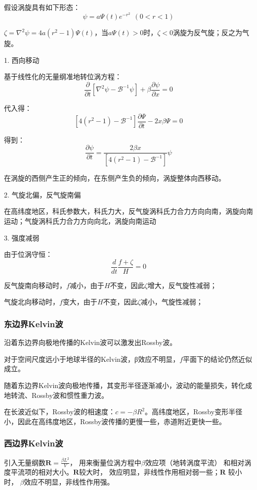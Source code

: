 \documentclass{article}
\begin{document}
假设涡旋具有如下形态：
$$\psi = a\Psi(t)e^{-r^2} \ \ (0<r<1)$$

$\zeta={{\nabla }}^{2}{{\psi }} = 4a(r^2-1)\Psi(t)$，当$a\Psi(t)>0$时，$\zeta<0$涡旋为反气旋；反之为气旋。

1. 西向移动

基于线性化的无量纲准地转位涡方程：
$$\frac{\partial }{\partial {{t}}}\left[ {{\nabla }}^{2}{{\psi }}-{\mathcal{B}^{-1}}{{\psi }} \right]+{{\beta }}\frac{\partial {{\psi }}}{\partial {{x}}}=0$$

代入得：
$$\left[ 4({{r}^{2}}-1)-{{\mathcal{B}}^{-1}} \right]\frac{\partial \Psi }{\partial t}-2x\beta \Psi =0$$

得到：
$$\frac{\partial \psi }{\partial t}=\frac{2\beta x}{\left[ 4({{r}^{2}}-1)-{{\mathcal{B}}^{-1}} \right]}\psi$$

在涡旋的西侧产生正的倾向，在东侧产生负的倾向，涡旋整体向西移动。

2. 气旋北偏，反气旋南偏 

在高纬度地区，科氏参数大，科氏力大，反气旋涡科氏力合力方向向南，涡旋向南运动；气旋涡科氏力合力方向向北，涡旋向南运动

3. 强度减弱

由于位涡守恒：
$$\frac{d}{dt}\frac{f+\zeta}{H}=0$$

反气旋南向移动时，$f$减小，由于$H$不变，因此$\zeta$增大，反气旋性减弱；

气旋北向移动时，$f$变大，由于$H$不变，因此$\zeta$减小，气旋性减弱；

\subsubsection{东边界Kelvin波}
沿着东边界向极地传播的Kelvin波可以激发出Rossby波。

对于空间尺度远小于地球半径的Kelvin波，β效应不明显，$f$平面下的结论仍然近似成立。

随着东边界Kelvin波向极地传播，其变形半径逐渐减小，波动的能量损失，转化成地转流、Rossby波和惯性重力波。

在长波近似下，Rossby波的相速度：$c=-\beta R^2$。高纬度地区，Rossby变形半径小，因此在高纬度地区，Rossby波传播的更慢一些，赤道附近更快一些。

\subsubsection{西边界Kelvin波}
引入无量纲数$\mathbf{R}=\frac{\beta L^2}{V}$，
用来衡量位涡方程中$\beta$效应项（地转涡度平流）
和相对涡度平流项的相对大小。$\mathbf{R}$较大时， 
效应明显，非线性作用相对弱一些；$\mathbf{R}$ 较小时，
$\beta$效应不明显，非线性作用强。
\end{document}
